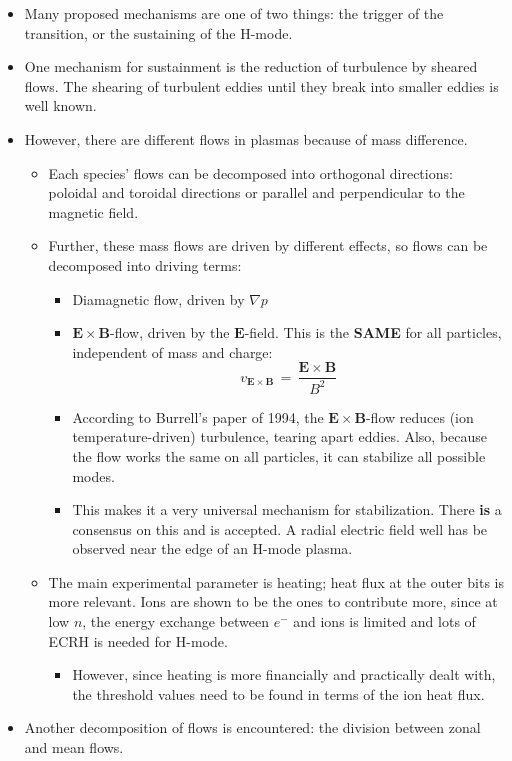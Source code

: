 \documentclass[a4paper]{article}
\begin{document}
\begin{itemize}
\item
  Many proposed mechanisms are one of two things: the trigger of the
  transition, or the sustaining of the H-mode.
\item
  One mechanism for sustainment is the reduction of turbulence by
  sheared flows. The shearing of turbulent eddies until they break into
  smaller eddies is well known.
\item
  However, there are different flows in plasmas because of mass
  difference.

  \begin{itemize}
  \item
    Each species' flows can be decomposed into orthogonal directions:
    poloidal and toroidal directions or parallel and perpendicular to
    the magnetic field.
  \item
    Further, these mass flows are driven by different effects, so flows
    can be decomposed into driving terms:

    \begin{itemize}
    \item
      Diamagnetic flow, driven by $\nabla p$
    \item
      $\mathbf{E}\times\mathbf{B}$-flow, driven by the
      $\mathbf{E}$-field. This is the \textbf{SAME} for all particles,
      independent of mass and charge:
      \[v_{\mathbf{E}\times\mathbf{B}} \,=\, \frac{\mathbf{E}\times\mathbf{B}}{B^2}\]
    \item
      According to Burrell's paper of 1994, the
      $\mathbf{E}\times\mathbf{B}$-flow reduces (ion temperature-driven)
      turbulence, tearing apart eddies. Also, because the flow works the
      same on all particles, it can stabilize all possible modes.
    \item
      This makes it a very universal mechanism for stabilization. There
      \textbf{is} a consensus on this and is accepted. A radial electric
      field well has be observed near the edge of an H-mode plasma.
    \end{itemize}
  \item
    The main experimental parameter is heating; heat flux at the outer
    bits is more relevant. Ions are shown to be the ones to contribute
    more, since at low $n$, the energy exchange between $e^-$ and ions
    is limited and lots of ECRH is needed for H-mode.

    \begin{itemize}
    \itemsep1pt\parskip0pt
    \item
      However, since heating is more financially and practically dealt
      with, the threshold values need to be found in terms of the ion
      heat flux.
    \end{itemize}
  \end{itemize}
\item
  Another decomposition of flows is encountered: the division between
  zonal and mean flows.


\end{itemize}
\end{document}

